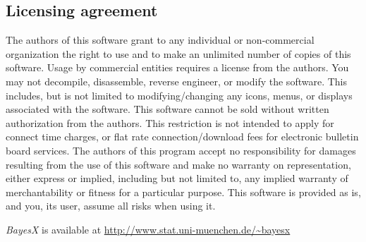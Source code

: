 {\subsection*{Licensing agreement} The authors of this software grant
to any individual or non-commercial organization the right to use and to make an unlimited number of copies of this software.
Usage by commercial entities requires a license from the authors. You may not decompile, disassemble, reverse engineer, or
modify the software. This includes, but is not limited to modifying/changing any icons, menus, or displays associated with the
software. This software cannot be sold without written authorization from the authors. This restriction is not intended to
apply for connect time charges, or flat rate connection/download fees for electronic bulletin board services. The authors of
this program accept no responsibility for damages resulting from the use of this software and make no warranty on
representation, either express or implied, including but not limited to, any implied warranty of merchantability or fitness for
a particular purpose. This software is provided as is, and you, its user, assume all risks when using it.

\vspace{0.5cm}

{\em BayesX} is available at { \href{http://www.stat.uni-muenchen.de/~bayesx}{http://www.stat.uni-muenchen.de/\~{}bayesx}}}
